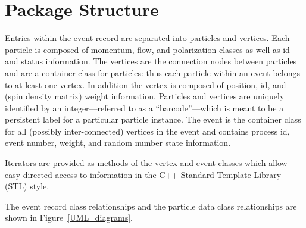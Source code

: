 \documentclass[11pt,letterpaper]{article}
\begin{document}
%
%

\section{Package Structure}

Entries within the event record are separated into particles and
vertices. Each particle is composed of momentum, flow, and
polarization classes as well as id and status information. 
The vertices are the connection nodes
between particles and are a container class for particles: thus each
particle within an event belongs to at least one vertex. In addition
the vertex is composed of position, id, and (spin density matrix) 
weight information. Particles and vertices are uniquely identified by
an integer---referred to as a ``barcode''---which is meant to be a
persistent label for a particular particle instance.
The event is the container class for all (possibly
inter-connected) vertices in the event and contains process id, event
number, weight, and random number state information.

Iterators are provided as methods of the vertex and event classes
which allow easy directed access to information in the C++ Standard
Template Library (STL) style.

The event record class relationships and the particle
data class relationships are shown in Figure~\ref{UML_diagrams}.
\end{document}
